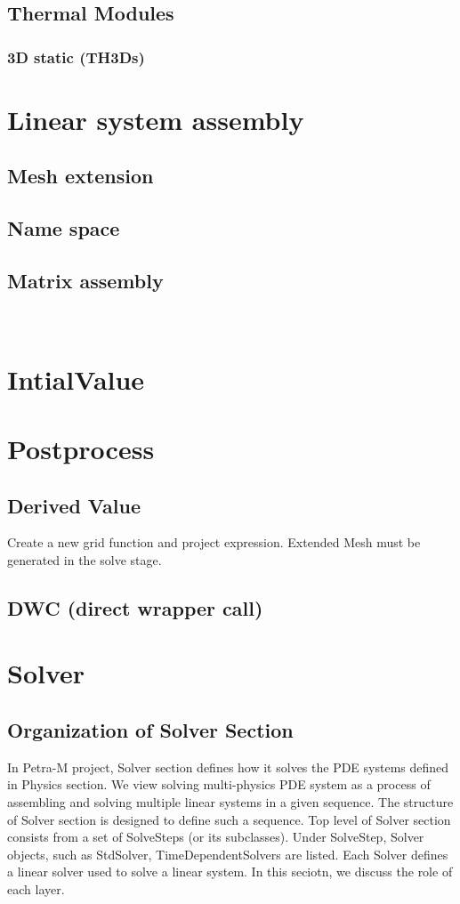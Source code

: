 \documentclass[11pt,a4paper,final]{report}
\begin{document}
\section{Thermal Modules}
\subsection{3D static (TH3Ds)}


\chapter{Linear system assembly}
\section{Mesh extension} 
\section{Name space}
\section{Matrix assembly}
\
\chapter{IntialValue}
\label{InitialValue}    

\chapter{Postprocess}
\label{Postprocess}       
\section{Derived Value}     
Create a new grid function and project expression.
Extended Mesh must be generated in the solve stage.

\section{DWC (direct wrapper call)}

\chapter{Solver}
\section{Organization of Solver Section}
In Petra-M project, Solver section defines how it solves the PDE systems defined in Physics section. 
We view solving multi-physics PDE system as a process of assembling and solving multiple linear systems in a given sequence. 
The structure of Solver section is designed to define such a sequence. 
Top level of Solver section consists from a set of SolveSteps (or its subclasses). 
Under SolveStep, Solver objects, such as StdSolver, TimeDependentSolvers are listed. 
Each Solver defines a linear solver used to solve a linear system. 
In this seciotn, we discuss the role of each layer. 
\end{document}
